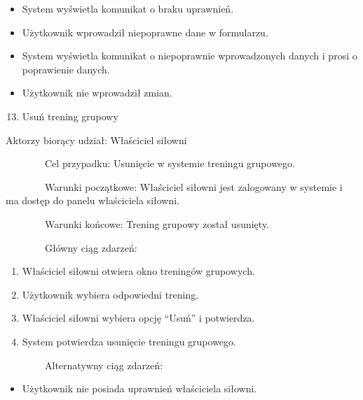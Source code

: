 \documentclass[
]{article}
\providecommand{\tightlist}{%
  \setlength{\itemsep}{0pt}\setlength{\parskip}{0pt}}
\begin{document}
\begin{itemize}
\tightlist
\item
  {System wyświetla komunikat o braku uprawnień.}
\end{itemize}

\begin{itemize}
\tightlist
\item
  {Użytkownik wprowadził niepoprawne dane w formularzu.}
\end{itemize}

\begin{itemize}
\tightlist
\item
  {System wyświetla komunikat o niepoprawnie wprowadzonych danych i
  prosi o poprawienie danych.}
\end{itemize}

\begin{itemize}
\tightlist
\item
  {Użytkownik nie wprowadził zmian.}
\end{itemize}

{\hfill\break
}

\begin{enumerate}
\setcounter{enumi}{12}
\tightlist
\item
  {Usuń trening grupowy}
\end{enumerate}

{Aktorzy biorący udział: Właściciel siłowni}

{~~~~~~~~Cel przypadku: Usunięcie w systemie treningu grupowego.}

{~~~~~~~~Warunki początkowe: Właściciel siłowni jest zalogowany w
systemie i ma dostęp do panelu właściciela siłowni.}

{~~~~~~~~Warunki końcowe: Trening grupowy został usunięty.}

{~~~~~~~~Główny ciąg zdarzeń:}

\begin{enumerate}
\tightlist
\item
  {Właściciel siłowni otwiera okno treningów grupowych.}
\item
  {Użytkownik wybiera odpowiedni trening.}
\item
  {Właściciel siłowni wybiera opcję ``Usuń'' i potwierdza.}
\item
  {System potwierdza usunięcie treningu grupowego.}
\end{enumerate}

{~~~~~~~~Alternatywny ciąg zdarzeń:}

\begin{itemize}
\tightlist
\item
  {Użytkownik nie posiada uprawnień właściciela siłowni.}
\end{itemize}
\end{document}
